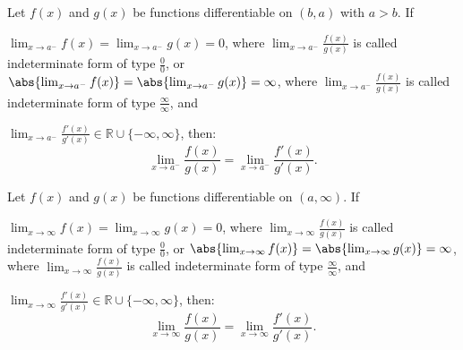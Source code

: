 Let $f(x)$ and $g(x)$ be functions differentiable on $(b,a)$ with $a>b$. If
\bit
\item $\lim_{x\to a^-}f(x)=\lim_{x\to a^-}g(x)=0$, where $\lim_{x\to a^-}\frac{f(x)}{g(x)}$ is called indeterminate form of type $\frac{0}{0}$, or $\abs{\lim_{x\to a^-}f(x)}=\abs{\lim_{x\to a^-}g(x)}=\infty$, where $\lim_{x\to a^-}\frac{f(x)}{g(x)}$ is called indeterminate form of type $\frac{\infty}{\infty}$, and
\item $\lim_{x\to a^-}\frac{f'(x)}{g'(x)}\in\mathbb{R}\cup\{-\infty,\infty\}$,
\eit
then:
\[\lim_{x\to a^-}\frac{f(x)}{g(x)}=\lim_{x\to a^-}\frac{f'(x)}{g'(x)}.\]

Let $f(x)$ and $g(x)$ be functions differentiable on $(a,\infty)$. If
\bit
\item $\lim_{x\to\infty}f(x)=\lim_{x\to\infty}g(x)=0$, where $\lim_{x\to\infty}\frac{f(x)}{g(x)}$ is called indeterminate form of type $\frac{0}{0}$, or $\abs{\lim_{x\to\infty}f(x)}=\abs{\lim_{x\to\infty}g(x)}=\infty$, where $\lim_{x\to\infty}\frac{f(x)}{g(x)}$ is called indeterminate form of type $\frac{\infty}{\infty}$, and
\item $\lim_{x\to\infty}\frac{f'(x)}{g'(x)}\in\mathbb{R}\cup\{-\infty,\infty\}$,
\eit
then:
\[\lim_{x\to\infty}\frac{f(x)}{g(x)}=\lim_{x\to\infty}\frac{f'(x)}{g'(x)}.\]

